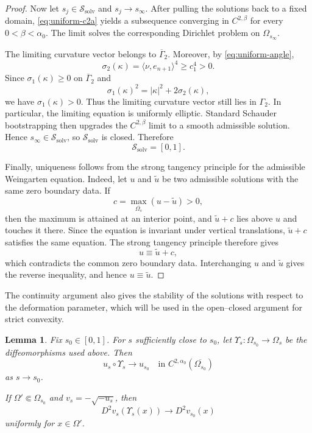 \documentclass{article}
\newtheorem{lemma}[theorem]{Lemma}
\numberwithin{equation}{section}
\begin{document}
\begin{proof}
Now let $s_j\in\mathcal S_{\mathrm{solv}}$ and $s_j\to s_\infty$.
After pulling the solutions back to a fixed domain,
\eqref{eq:uniform-c2a} yields a subsequence converging in
$C^{2,\beta}$ for every $0<\beta<\alpha_0$. The limit solves the
corresponding Dirichlet problem on $\Omega_{s_\infty}$.

The limiting curvature vector belongs to
$\overline{\Gamma}_2$. Moreover, by \eqref{eq:uniform-angle},
\[
\sigma_2(\kappa)
=
\langle\nu,e_{n+1}\rangle^4
\ge c_1^4>0.
\]
Since $\sigma_1(\kappa)\ge0$ on $\overline{\Gamma}_2$ and
\[
\sigma_1(\kappa)^2=|\kappa|^2+2\sigma_2(\kappa),
\]
we have $\sigma_1(\kappa)>0$. Thus the limiting curvature vector
still lies in $\Gamma_2$. In particular, the limiting equation is
uniformly elliptic. Standard Schauder bootstrapping then upgrades
the $C^{2,\beta}$ limit to a smooth admissible solution. Hence
$s_\infty\in\mathcal S_{\mathrm{solv}}$, so
$\mathcal S_{\mathrm{solv}}$ is closed. Therefore
\[
\mathcal S_{\mathrm{solv}}=[0,1].
\]

Finally, uniqueness follows from the strong tangency principle for
the admissible Weingarten equation. Indeed, let $u$ and $\widetilde u$
be two admissible solutions with the same zero boundary data. If
\[
c=\max_{\overline{\Omega_s}}(u-\widetilde u)>0,
\]
then the maximum is attained at an interior point, and
$\widetilde u+c$ lies above $u$ and touches it there. Since the
equation is invariant under vertical translations,
$\widetilde u+c$ satisfies the same equation. The strong tangency
principle therefore gives
\[
u\equiv \widetilde u+c,
\]
which contradicts the common zero boundary data. Interchanging
$u$ and $\widetilde u$ gives the reverse inequality, and hence
$u\equiv\widetilde u$.
\end{proof}

The continuity argument also gives the stability of the solutions
with respect to the deformation parameter, which will be used in the
open--closed argument for strict convexity.

\begin{lemma}
\label{lem:real-local-stability}
Fix $s_0\in[0,1]$. For $s$ sufficiently close to $s_0$, let
$\Upsilon_s:\Omega_{s_0}\to\Omega_s$ be the diffeomorphisms used
above. Then
\[
u_s\circ\Upsilon_s
\longrightarrow u_{s_0}
\quad\text{in }
C^{2,\alpha_0}(\overline{\Omega_{s_0}})
\]
as $s\to s_0$.

If $\Omega'\Subset\Omega_{s_0}$ and
$v_s=-\sqrt{-u_s}$, then
\[
D^2v_s(\Upsilon_s(x))
\longrightarrow D^2v_{s_0}(x)
\]
uniformly for $x\in\Omega'$.
\end{lemma}
\end{document}
